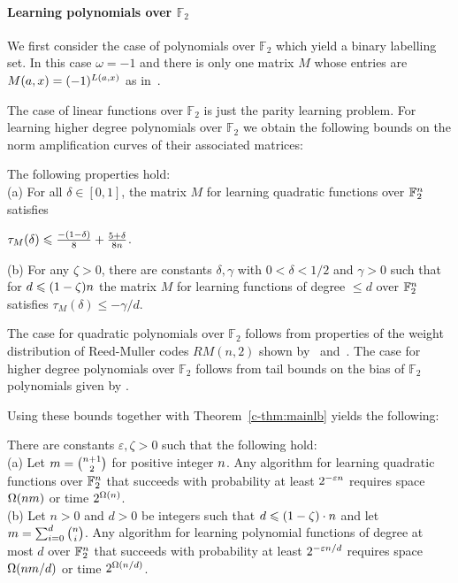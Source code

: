 \paragraph{Learning polynomials over $\mathbb{F}_2$}

We first consider the case of polynomials over $\mathbb{F}_2$ which yield 
a binary labelling set.
In this case $\omega=-1$ and there is only one matrix $M$ whose entries
are $M(a,x)=(-1)^{L(a,x)}$ as in~\cite{DBLP:conf/focs/Raz17}.

The case of linear functions over $\mathbb{F}_2$ is just the parity learning problem.  
For learning higher degree polynomials over $\mathbb{F}_2$ we obtain the following bounds on the norm amplification curves of their
associated matrices:

\begin{theorem} The following properties hold:\\
(a) For all $\delta\in [0,1]$, the matrix $M$ for learning quadratic functions over
$\mathbb{F}_2^n$ satisfies\\ \centerline{$\tau_M(\delta)\leqslant \frac{-(1-\delta)}8+\frac{5+\delta}{8n}$.}
(b) For any $\zeta>0$, there are constants $\delta,\gamma$ with $0<\delta<1/2$ and
$\gamma>0$
such that for $d\leqslant (1-\zeta) n$ the matrix $M$ for learning functions of degree $\le d$ over $\mathbb{F}_2^n$  
satisfies $\tau_M(\delta)\le -\gamma/d$.
\end{theorem}

The case for quadratic polynomials over $\mathbb{F}_2$
follows from properties of the weight distribution of Reed-Muller codes $RM(n,2)$ shown by~\cite{DBLP:journals/tit/SloaneB70} and~\cite{mceliece1967linear}.
The case for higher degree polynomials over $\mathbb{F}_2$ follows
from tail bounds on the bias of $\mathbb{F}_2$ polynomials given by
\cite{DBLP:journals/cc/Ben-EliezerHL12}.

Using these bounds together with Theorem~\ref{c-thm:mainlb} yields the following:

\begin{theorem}
\label{cor:quadratic} There are constants $\varepsilon,\zeta>0$ such that the following hold: \\
(a) Let $m=\binom{n+1}2$ for positive integer
$n$. 
Any algorithm for learning quadratic functions over
$\mathbb{F}_2^n$ that succeeds with probability at least
$2^{-\varepsilon n}$ requires space $\Omega(nm)$ or time $2^{\Omega(n)}$.\\
(b)
Let $n>0$ and $d>0$ be integers such that 
$d\leqslant (1-\zeta) \cdot n$ and let $m=\sum_{i=0}^d \binom{n}i$.
Any algorithm for learning polynomial functions of degree at most $d$ over
$\mathbb{F}_2^n$ that succeeds with probability at least
$2^{-\varepsilon n/d}$ requires space $\Omega(nm/d)$ or
time $2^{\Omega(n/d)}$.
\end{theorem}

